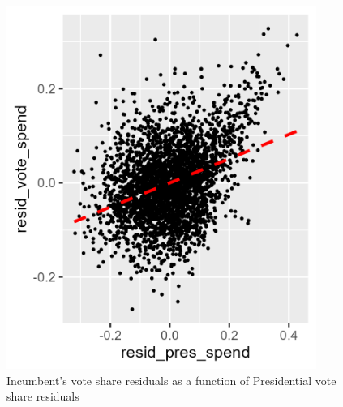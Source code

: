 \documentclass[12pt,letterpaper]{article}
\begin{document}
  \begin{figure}
    \includegraphics[width=0.9\textwidth]{Graphics/residuals.png}
    \caption{Incumbent's vote share residuals as a function of Presidential vote share residuals}
    \label{fig:residuals}
  \end{figure}

\clearpage
\newpage	
\end{document}
